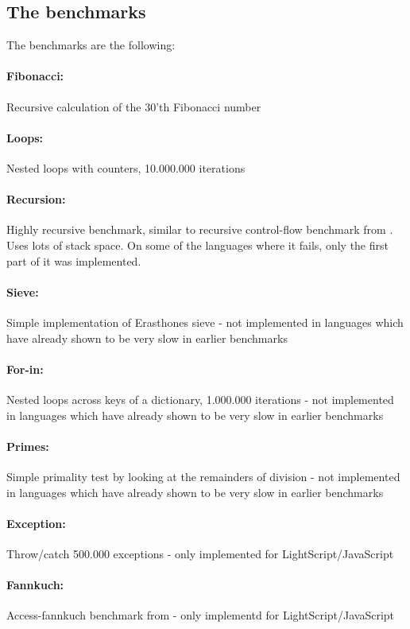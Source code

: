 \documentclass[11pt]{report}
\begin{document}
\subsection{The benchmarks}
The benchmarks are the following:

\paragraph{Fibonacci:} Recursive calculation of the 30'th Fibonacci number
\paragraph{Loops:} Nested loops with counters, 10.000.000 iterations
\paragraph{Recursion:} Highly recursive benchmark, similar to recursive control-flow benchmark from \cite{sunspider, shootout}. Uses lots of stack space. On some of the languages where it fails, only the first part of it was implemented.
\paragraph{Sieve:} Simple implementation of Erasthones sieve - not implemented in languages which have already shown to be very slow in earlier benchmarks
\paragraph{For-in:} Nested loops across keys of a dictionary, 1.000.000 iterations - not implemented in languages which have already shown to be very slow in earlier benchmarks
\paragraph{Primes:} Simple primality test by looking at the remainders of division - not implemented in languages which have already shown to be very slow in earlier benchmarks
\paragraph{Exception:} Throw/catch 500.000 exceptions - only implemented for LightScript/JavaScript
\paragraph{Fannkuch:} Access-fannkuch benchmark from \cite{sunspider, shootout} - only implementd for LightScript/JavaScript
\end{document}
